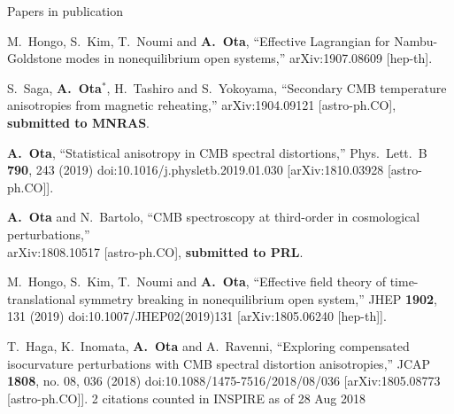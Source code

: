 \documentclass[a4paper]{resume} %
\begin{document}
\begin{rSection}{Papers in publication}


\begin{etaremune}

\item
  M.~Hongo, S.~Kim, T.~Noumi and {\bf A.~Ota},
  ``Effective Lagrangian for Nambu-Goldstone modes in nonequilibrium open systems,''
  arXiv:1907.08609 [hep-th].


\item
\label{Saga:2019ora} 
  S.~Saga, {\bf A.~Ota$^*$}, H.~Tashiro and S.~Yokoyama,
  ``Secondary CMB temperature anisotropies from magnetic reheating,''
  arXiv:1904.09121 [astro-ph.CO], {\bf submitted to MNRAS}.



\item  
  {\bf A.~Ota},
  ``Statistical anisotropy in CMB spectral distortions,''
  Phys.\ Lett.\ B {\bf 790}, 243 (2019)
  doi:10.1016/j.physletb.2019.01.030
  [arXiv:1810.03928 [astro-ph.CO]].
  

\item
\label{Ota:2018zwm} 
  {\bf A.~Ota} and N.~Bartolo,
  ``CMB spectroscopy at third-order in cosmological perturbations,''\\
  arXiv:1808.10517 [astro-ph.CO], {\bf submitted to PRL}.
    \item 
      M.~Hongo, S.~Kim, T.~Noumi and {\bf A.~Ota},
  ``Effective field theory of time-translational symmetry breaking in nonequilibrium open system,''
  JHEP {\bf 1902}, 131 (2019)
  doi:10.1007/JHEP02(2019)131
  [arXiv:1805.06240 [hep-th]].



\item
  T.~Haga, K.~Inomata, {\bf A.~Ota} and A.~Ravenni,
  ``Exploring compensated isocurvature perturbations with CMB spectral distortion anisotropies,''
  JCAP {\bf 1808}, no. 08, 036 (2018)
  doi:10.1088/1475-7516/2018/08/036
  [arXiv:1805.08773 [astro-ph.CO]].
  2 citations counted in INSPIRE as of 28 Aug 2018
  

\end{etaremune}
\end{rSection}
\end{document}
